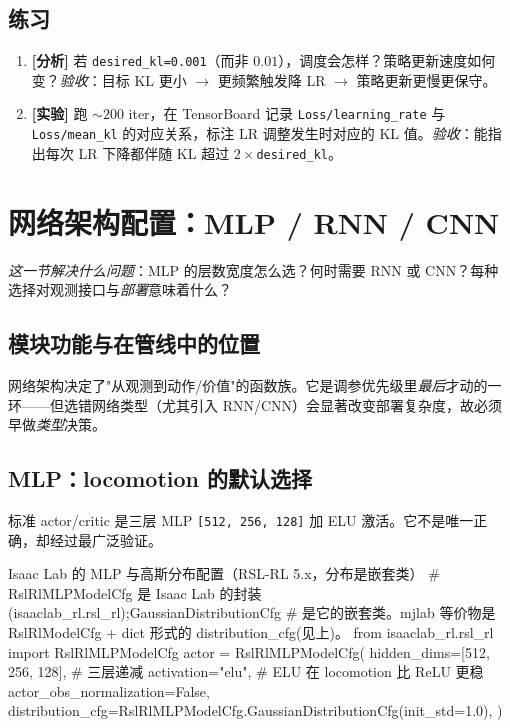 \subsection{练习}

\begin{practice}[KL 调度行为]
\begin{enumerate}
  \item \textbf{[分析]} 若 \verb|desired_kl=0.001|（而非 $0.01$），调度会怎样？策略更新速度如何变？\emph{验收}：目标 KL 更小 $\to$ 更频繁触发降 LR $\to$ 策略更新更慢更保守。
  \item \textbf{[实验]} 跑 $\sim200$ iter，在 TensorBoard 记录 \verb|Loss/learning_rate| 与 \verb|Loss/mean_kl| 的对应关系，标注 LR 调整发生时对应的 KL 值。\emph{验收}：能指出每次 LR 下降都伴随 KL 超过 $2\times$\verb|desired_kl|。
\end{enumerate}
\end{practice}

\section{网络架构配置：MLP / RNN / CNN}
\label{sec:rlmc-train-network}

\emph{这一节解决什么问题}：MLP 的层数宽度怎么选？何时需要 RNN 或 CNN？每种选择对观测接口与\emph{部署}意味着什么？

\subsection{模块功能与在管线中的位置}

网络架构决定了"从观测到动作/价值"的函数族。它是调参优先级里\emph{最后}才动的一环——但选错网络类型（尤其引入 RNN/CNN）会显著改变部署复杂度，故必须早做\emph{类型}决策。

\subsection{MLP：locomotion 的默认选择}

标准 actor/critic 是三层 MLP \verb|[512, 256, 128]| 加 ELU 激活。它不是唯一正确，却经过最广泛验证。

\begin{codebox}[Python]{Isaac Lab 的 MLP 与高斯分布配置（RSL-RL 5.x，分布是嵌套类）}
# RslRlMLPModelCfg 是 Isaac Lab 的封装(isaaclab_rl.rsl_rl);GaussianDistributionCfg
# 是它的嵌套类。mjlab 等价物是 RslRlModelCfg + dict 形式的 distribution_cfg(见上)。
from isaaclab_rl.rsl_rl import RslRlMLPModelCfg
actor = RslRlMLPModelCfg(
    hidden_dims=[512, 256, 128],   # 三层递减
    activation="elu",               # ELU 在 locomotion 比 ReLU 更稳
    actor_obs_normalization=False,
    distribution_cfg=RslRlMLPModelCfg.GaussianDistributionCfg(init_std=1.0),
)
\end{codebox}

